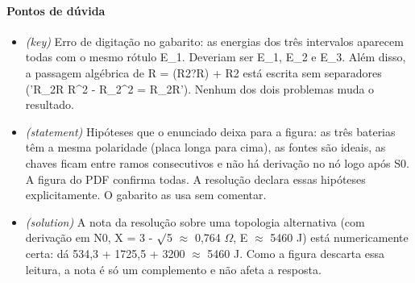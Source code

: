 \documentclass{article}%
\begin{document}
\paragraph{Pontos de dúvida}%
\begin{itemize}%
\item%
\textit{(key)} Erro de digitação no gabarito: as energias dos três intervalos aparecem todas com o mesmo rótulo E\_1. Deveriam ser E\_1, E\_2 e E\_3. Além disso, a passagem algébrica de R = (R2?R) + R2 está escrita sem separadores ('R\_2R R\^{}2 {-} R\_2\^{}2 = R\_2R'). Nenhum dos dois problemas muda o resultado.%
\item%
\textit{(statement)} Hipóteses que o enunciado deixa para a figura: as três baterias têm a mesma polaridade (placa longa para cima), as fontes são ideais, as chaves ficam entre ramos consecutivos e não há derivação no nó logo após S0. A figura do PDF confirma todas. A resolução declara essas hipóteses explicitamente. O gabarito as usa sem comentar.%
\item%
\textit{(solution)} A nota da resolução sobre uma topologia alternativa (com derivação em N0, X = 3 - $\surd$5 $\approx$ 0,764 $\Omega$, E $\approx$ 5460 J) está numericamente certa: dá 534,3 + 1725,5 + 3200 $\approx$ 5460 J. Como a figura descarta essa leitura, a nota é só um complemento e não afeta a resposta.%
\end{itemize}%
\end{document}
